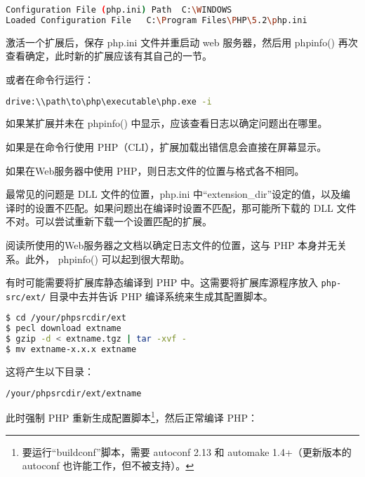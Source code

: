 \begin{compactitem}
\begin{lstlisting}[language=bash]
Configuration File (php.ini) Path  C:\WINDOWS
Loaded Configuration File   C:\Program Files\PHP\5.2\php.ini
\end{lstlisting}

激活一个扩展后，保存 php.ini 文件并重启动 web 服务器，然后用 phpinfo() 再次查看确定，此时新的扩展应该有其自己的一节。

或者在命令行运行：

\begin{lstlisting}[language=bash]
drive:\\path\to\php\executable\php.exe -i
\end{lstlisting}

如果某扩展并未在 phpinfo() 中显示，应该查看日志以确定问题出在哪里。

\begin{compactitem}
\item 如果是在命令行使用 PHP（CLI），扩展加载出错信息会直接在屏幕显示。
\item 如果在Web服务器中使用 PHP，则日志文件的位置与格式各不相同。
\end{compactitem}

最常见的问题是 DLL 文件的位置，php.ini 中“extension\_dir”设定的值，以及编译时的设置不匹配。如果问题出在编译时设置不匹配，那可能所下载的 DLL 文件不对。可以尝试重新下载一个设置匹配的扩展。

阅读所使用的Web服务器之文档以确定日志文件的位置，这与 PHP 本身并无关系。此外， phpinfo() 可以起到很大帮助。



\end{compactitem}


有时可能需要将扩展库静态编译到 PHP 中。这需要将扩展库源程序放入 \texttt{php-src/ext/} 目录中去并告诉 PHP 编译系统来生成其配置脚本。


\begin{lstlisting}[language=bash]
$ cd /your/phpsrcdir/ext
$ pecl download extname
$ gzip -d < extname.tgz | tar -xvf -
$ mv extname-x.x.x extname
\end{lstlisting}

这将产生以下目录：

\begin{lstlisting}[language=bash]
/your/phpsrcdir/ext/extname
\end{lstlisting}

此时强制 PHP 重新生成配置脚本\footnote{要运行“buildconf”脚本，需要 autoconf 2.13 和 automake 1.4+（更新版本的 autoconf 也许能工作，但不被支持）。}，然后正常编译 PHP：

